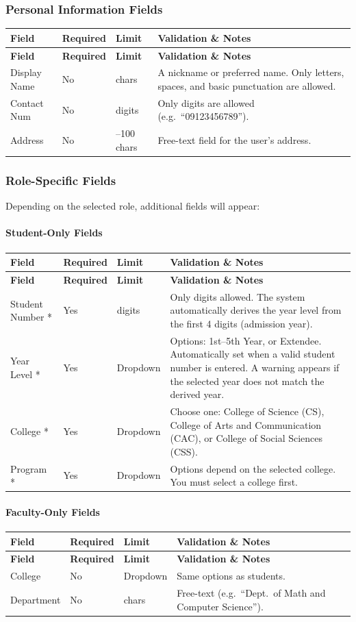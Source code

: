 \documentclass[12pt, a4paper]{article}
\newenvironment{fieldtable}{%
  \begin{longtable}{|>{\raggedright\arraybackslash}p{2.5cm}|>{\raggedright\arraybackslash}p{1.5cm}|>{\raggedright\arraybackslash}p{2.5cm}|>{\raggedright\arraybackslash}p{7.5cm}|}
  \hline
  \rowcolor{lightgray}
  \textbf{Field} & \textbf{Required} & \textbf{Limit} & \textbf{Validation \& Notes} \\
  \hline
  \endfirsthead
  \hline
  \rowcolor{lightgray}
  \textbf{Field} & \textbf{Required} & \textbf{Limit} & \textbf{Validation \& Notes} \\
  \hline
  \endhead
  \hline
  \endfoot
}{%
  \end{longtable}
}
\newcommand{\fieldrow}[4]{%
  #1 & #2 & #3 & #4 \\ \hline
}
\begin{document}
\subsubsection{Personal Information Fields}

\begin{fieldtable}
  \fieldrow{Display Name}{No}{30 chars}{A nickname or preferred name. Only letters, spaces, and basic punctuation are allowed.}
  \fieldrow{Contact Num}{No}{11 digits}{Only digits are allowed (e.g.\ ``09123456789'').}
  \fieldrow{Address}{No}{64--100 chars}{Free-text field for the user's address.}
\end{fieldtable}

\subsubsection{Role-Specific Fields}

Depending on the selected role, additional fields will appear:

\paragraph{Student-Only Fields}

\begin{fieldtable}
  \fieldrow{Student Number *}{Yes}{9 digits}{Only digits allowed. The system automatically derives the year level from the first 4 digits (admission year).}
  \fieldrow{Year Level *}{Yes}{Dropdown}{Options: 1st--5th Year, or Extendee. Automatically set when a valid student number is entered. A warning appears if the selected year does not match the derived year.}
  \fieldrow{College *}{Yes}{Dropdown}{Choose one: College of Science (CS), College of Arts and Communication (CAC), or College of Social Sciences (CSS).}
  \fieldrow{Program *}{Yes}{Dropdown}{Options depend on the selected college. You must select a college first.}
\end{fieldtable}

\paragraph{Faculty-Only Fields}

\begin{fieldtable}
  \fieldrow{College}{No}{Dropdown}{Same options as students.}
  \fieldrow{Department}{No}{64 chars}{Free-text (e.g.\ ``Dept.\ of Math and Computer Science'').}
\end{fieldtable}
\end{document}
